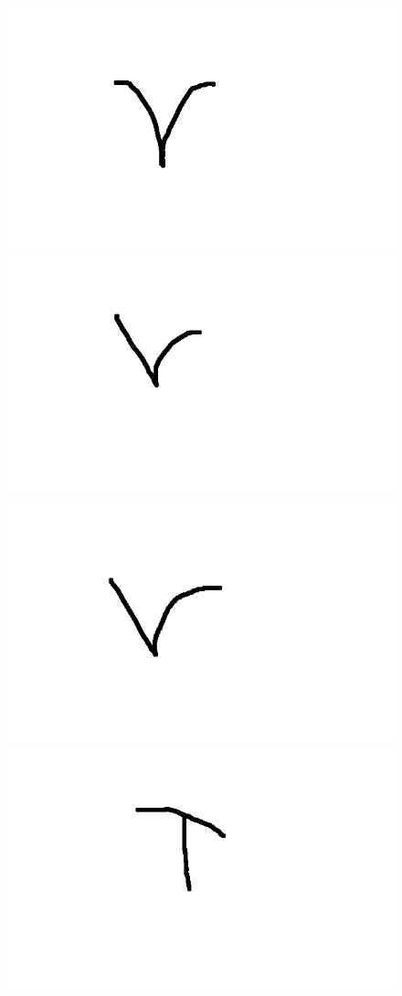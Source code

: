 \documentclass[a4paper,12px,twocolumn]{article}
\begin{document}
\begin{flushleft}
\begin{figure}[h!]
        \includegraphics[scale=0.1]{tv11}
        \includegraphics[scale=0.1]{tv12}
        \includegraphics[scale=0.1]{tv13}
        \includegraphics[scale=0.1]{tT11}

\end{figure}
\end{flushleft}
\end{document}
